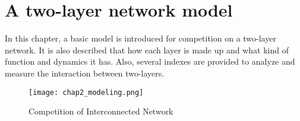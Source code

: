 
\chapter{A two-layer network model}
\label{chap2}
In this chapter, a basic model is introduced for competition on a two-layer network. It is also described that how each layer is made up and what kind of function and dynamics it has. Also, several indexes are provided to analyze and measure the interaction between two-layers.
\begin{figure}[!htb]
	\centering
	\texttt{[image: chap2\_modeling.png]}
	\caption{Competition of Interconnected Network}
	\label{chap2_modeling}
\end{figure}
 
